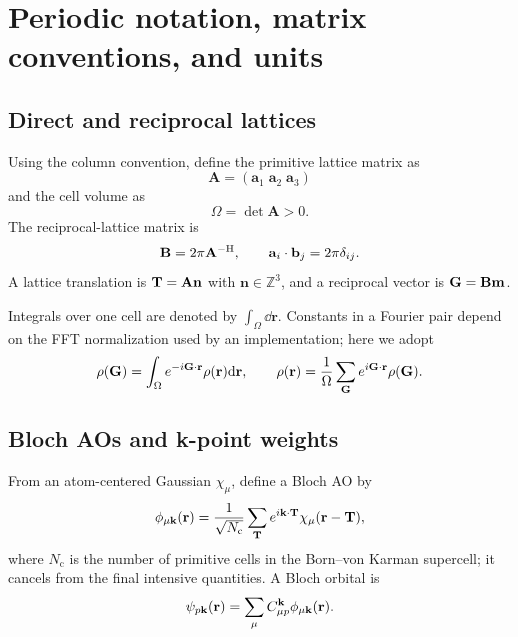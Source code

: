 \section{Periodic notation, matrix conventions, and units}
\label{sec:notation}

\subsection{Direct and reciprocal lattices}

Using the column convention, define the primitive lattice matrix as
\begin{equation}
  \mathbf A=(\mathbf a_1\;\mathbf a_2\;\mathbf a_3)
\end{equation}
and the cell volume as
\begin{equation}
  \Omega=\det\mathbf A>0.
  \label{eq:cell-volume}
\end{equation}
The reciprocal-lattice matrix is
\begin{equation}
  \mathbf B=2\pi\mathbf A^{-\mathrm{H}},
  \qquad
  \mathbf a_i\cdot\mathbf b_j=2\pi\delta_{ij}.
  \label{eq:reciprocal-lattice}
\end{equation}
A lattice translation is $\mathbf{T}=\mathbf A\mathbf n$ with
$\mathbf n\in\mathbb Z^3$, and a reciprocal vector is
$\mathbf{G}=\mathbf B\mathbf m$.

Integrals over one cell are denoted by $\int_\Omega\dd\mathbf r$.  Constants
in a Fourier pair depend on the FFT normalization used by an implementation;
here we adopt
\begin{equation}
  \rho(\mathbf{G})=\int_\Omega e^{-i\mathbf{G}\cdot\mathbf r}\rho(\mathbf r)\mathrm{d}\mathbf r,
  \qquad
  \rho(\mathbf r)=\frac{1}{\Omega}\sum_{\mathbf{G}}
  e^{i\mathbf{G}\cdot\mathbf r}\rho(\mathbf{G}).
  \label{eq:fourier-pair}
\end{equation}

\subsection{Bloch AOs and k-point weights}

From an atom-centered Gaussian $\chi_\mu$, define a Bloch AO by
\begin{equation}
  \phi_{\mu\mathbf{k}}(\mathbf r)
  =\frac{1}{\sqrt{N_{\mathrm c}}}
   \sum_{\mathbf{T}}e^{i\mathbf{k}\cdot\mathbf{T}}
   \chi_\mu(\mathbf r-\mathbf{T}),
  \label{eq:bloch-ao}
\end{equation}
where $N_{\mathrm c}$ is the number of primitive cells in the Born--von Karman
supercell; it cancels from the final intensive quantities.  A Bloch orbital is
\begin{equation}
  \psi_{p\mathbf{k}}(\mathbf r)
  =\sum_\mu C_{\mu p}^{\mathbf{k}}\phi_{\mu\mathbf{k}}(\mathbf r).
  \label{eq:bloch-mo}
\end{equation}

